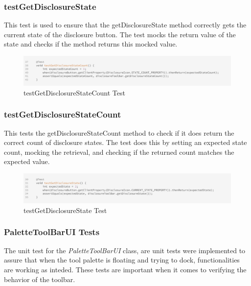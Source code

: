 \subsubsection{testGetDisclosureState}
This test is used to ensure that the getDisclosureState method correctly gets the current state of the disclosure button.
The test mocks the return value of the state and checks if the method returns this mocked value.

\begin{figure}[H]
    \centering
    \includegraphics[width=\linewidth]{pic/Test testGetDisclosureStateCount.png}
    \caption{testGetDisclosureStateCount Test}
    \label{fig:testGetDisclosureStateCount Test}
\end{figure}

\subsubsection{testGetDisclosureStateCount}
This tests the getDisclosureStateCount method to check if it does return the correct count of disclosure states.
The test does this by setting an expected state count, mocking the retrieval, and checking if the returned count matches the expected value.

\begin{figure}[H]
    \centering
    \includegraphics[width=\linewidth]{pic/Test testGetDisclosureState.png}
    \caption{testGetDisclosureState Test}
    \label{fig:testGetDisclosureState Test}
\end{figure}




\subsubsection{PaletteToolBarUI Tests}
The unit test for the \textit{PaletteToolBarUI} class, are unit tests were implemented to assure that when the tool palette is floating and trying to dock, functionalities are
working as inteded.
These tests are important when it comes to verifying the behavior of the toolbar.

